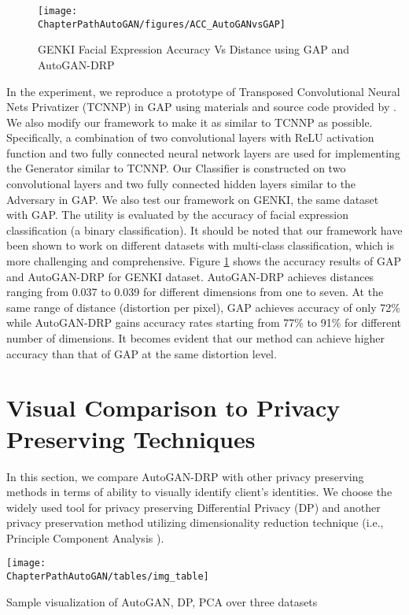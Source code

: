 \begin{figure}[H]
	\texttt{[image: \\ChapterPathAutoGAN/figures/ACC\_AutoGANvsGAP]}
	\caption[Facial expression accuracy and distance.]{GENKI Facial Expression Accuracy Vs Distance using GAP and AutoGAN-DRP}
	\label{fig:genki}
\end{figure}

In the experiment, we reproduce a prototype of Transposed Convolutional Neural Nets Privatizer (TCNNP) in GAP using materials and source code provided by \cite{GAP}. We also modify our framework to make it as similar to TCNNP as possible. Specifically, a combination of two convolutional layers with ReLU activation function and two fully connected neural network layers are used for implementing the Generator similar to TCNNP. Our Classifier is constructed on two convolutional layers and two fully connected hidden layers similar to the Adversary in GAP. We also test our framework on GENKI, the same dataset with GAP. The utility is evaluated by the accuracy of facial expression classification (a binary classification). It should be noted that our framework have been shown to work on different datasets with multi-class classification, which is more challenging and comprehensive. Figure \ref{fig:genki} shows the accuracy results of GAP and AutoGAN-DRP for GENKI dataset. AutoGAN-DRP achieves distances ranging from 0.037 to 0.039 for different dimensions from one to seven. At the same range of distance (distortion per pixel), GAP achieves accuracy of only 72\% while AutoGAN-DRP gains accuracy rates starting from 77\% to 91\% for different number of dimensions. It becomes evident that our method can achieve higher accuracy than that of GAP at the same distortion level.        



\section{Visual Comparison to Privacy Preserving Techniques}
\label{sec:AutoGAN_DP_PCA}

In this section, we compare AutoGAN-DRP with other privacy preserving methods in terms of ability to visually identify client's identities. We choose the widely used tool for privacy preserving Differential Privacy (DP) \cite{Dwork2006} and another privacy preservation method utilizing dimensionality reduction technique (i.e., Principle Component Analysis \cite{PCA} ).
 
 \begin{table*}[http!]
 	\centering
 	\texttt{[image: \\ChapterPathAutoGAN/tables/img\_table]}
 	\caption{Sample visualization of AutoGAN, DP, PCA over three datasets}
 	\label{table:visualization}
 \end{table*}
 
